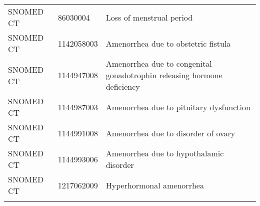 \begin{longtable}{p{}p{}p{}}
  SNOMED CT & 86030004 & Loss of menstrual period \\ 
  SNOMED CT & 1142058003 & Amenorrhea due to obstetric fistula \\ 
  SNOMED CT & 1144947008 & Amenorrhea due to congenital gonadotrophin releasing hormone deficiency \\ 
  SNOMED CT & 1144987003 & Amenorrhea due to pituitary dysfunction \\ 
  SNOMED CT & 1144991008 & Amenorrhea due to disorder of ovary \\ 
  SNOMED CT & 1144993006 & Amenorrhea due to hypothalamic disorder \\ 
  SNOMED CT & 1217062009 & Hyperhormonal amenorrhea \\ 
  \hline
\label{tab:codes_lc_anxiety_depression}
\end{longtable}

